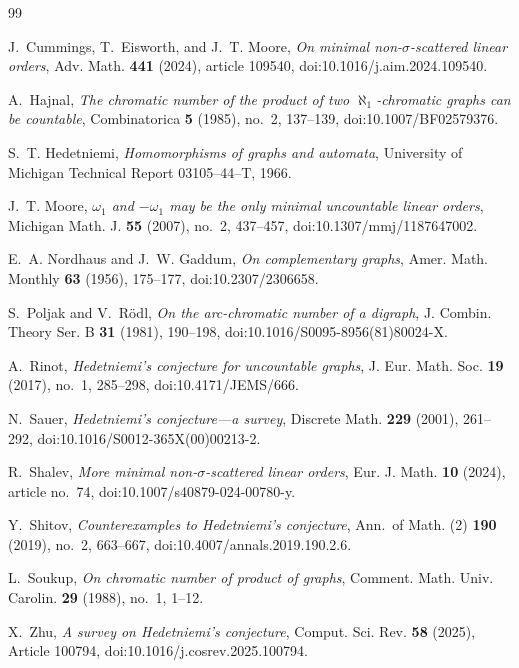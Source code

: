 \documentclass{amsart}
\numberwithin{equation}{section}
\theoremstyle{definition}
\theoremstyle{remark}
\begin{document}
\begin{thebibliography}{99}

J.~Cummings, T.~Eisworth, and J.~T. Moore,
\emph{On minimal non-$\sigma$-scattered linear orders},
Adv. Math. \textbf{441} (2024), article 109540,
doi:10.1016/j.aim.2024.109540.

A.~Hajnal,
\emph{The chromatic number of the product of two
$\aleph_1$-chromatic graphs can be countable},
Combinatorica \textbf{5} (1985), no.~2, 137--139,
doi:10.1007/BF02579376.

S.~T. Hedetniemi,
\emph{Homomorphisms of graphs and automata},
University of Michigan Technical Report 03105--44--T, 1966.

J.~T. Moore,
\emph{$\omega_1$ and $-\omega_1$ may be the only minimal uncountable
linear orders},
Michigan Math. J. \textbf{55} (2007), no.~2, 437--457,
doi:10.1307/mmj/1187647002.

E.~A. Nordhaus and J.~W. Gaddum,
\emph{On complementary graphs},
Amer. Math. Monthly \textbf{63} (1956), 175--177,
doi:10.2307/2306658.

S.~Poljak and V.~R\"odl,
\emph{On the arc-chromatic number of a digraph},
J. Combin. Theory Ser. B \textbf{31} (1981), 190--198,
doi:10.1016/S0095-8956(81)80024-X.

A.~Rinot,
\emph{Hedetniemi's conjecture for uncountable graphs},
J. Eur. Math. Soc. \textbf{19} (2017), no.~1, 285--298,
doi:10.4171/JEMS/666.

N.~Sauer,
\emph{Hedetniemi's conjecture---a survey},
Discrete Math. \textbf{229} (2001), 261--292,
doi:10.1016/S0012-365X(00)00213-2.

R.~Shalev,
\emph{More minimal non-$\sigma$-scattered linear orders},
Eur. J. Math. \textbf{10} (2024), article no.~74,
doi:10.1007/s40879-024-00780-y.

Y.~Shitov,
\emph{Counterexamples to Hedetniemi's conjecture},
Ann.\ of Math. (2) \textbf{190} (2019), no.~2, 663--667,
doi:10.4007/annals.2019.190.2.6.

L.~Soukup,
\emph{On chromatic number of product of graphs},
Comment. Math. Univ. Carolin. \textbf{29} (1988), no.~1, 1--12.

X.~Zhu,
\emph{A survey on Hedetniemi's conjecture},
Comput. Sci. Rev. \textbf{58} (2025), Article 100794,
doi:10.1016/j.cosrev.2025.100794.

\end{thebibliography}
\end{document}
